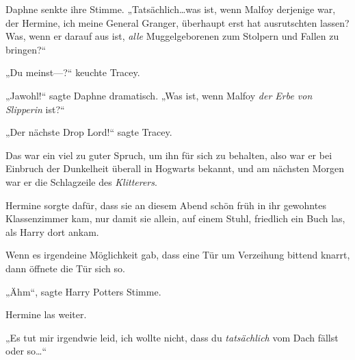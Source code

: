 Daphne senkte ihre Stimme. „Tatsächlich…was ist, wenn Malfoy derjenige war, der Hermine, ich meine General Granger, überhaupt erst hat ausrutschten lassen? Was, wenn er darauf aus ist, \emph{alle} Muggelgeborenen zum Stolpern und Fallen zu bringen?“

„Du meinst—?“ keuchte Tracey.

„Jawohl!“ sagte Daphne dramatisch. „Was ist, wenn Malfoy \emph{der Erbe von} \emph{Slipperin} ist?“%

„Der nächste Drop Lord!“%
sagte Tracey.

Das war ein viel zu guter Spruch, um ihn für sich zu behalten, also war er bei Einbruch der Dunkelheit überall in Hogwarts bekannt, und am nächsten Morgen war er die Schlagzeile des \emph{Klitterers}.


Hermine sorgte dafür, dass sie an diesem Abend schön früh in ihr gewohntes Klassenzimmer kam, nur damit sie allein, auf einem Stuhl, friedlich ein Buch las, als Harry dort ankam.

Wenn es irgendeine Möglichkeit gab, dass eine Tür um Verzeihung bittend knarrt, dann öffnete die Tür sich so.

„Ähm“, sagte Harry Potters Stimme.

Hermine las weiter.

„Es tut mir irgendwie leid, ich wollte nicht, dass du \emph{tatsächlich} vom Dach fällst oder so…“

